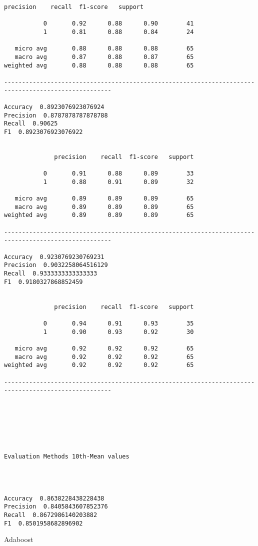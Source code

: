 \documentclass[11pt]{article}
\begin{document}
\begin{Verbatim}[commandchars=\\\{\}]
              precision    recall  f1-score   support

           0       0.92      0.88      0.90        41
           1       0.81      0.88      0.84        24

   micro avg       0.88      0.88      0.88        65
   macro avg       0.87      0.88      0.87        65
weighted avg       0.88      0.88      0.88        65

---------------------------------------------------------------------------------------------------- 

Accuracy  0.8923076923076924
Precision  0.8787878787878788
Recall  0.90625
F1  0.8923076923076922


              precision    recall  f1-score   support

           0       0.91      0.88      0.89        33
           1       0.88      0.91      0.89        32

   micro avg       0.89      0.89      0.89        65
   macro avg       0.89      0.89      0.89        65
weighted avg       0.89      0.89      0.89        65

---------------------------------------------------------------------------------------------------- 

Accuracy  0.9230769230769231
Precision  0.9032258064516129
Recall  0.9333333333333333
F1  0.9180327868852459


              precision    recall  f1-score   support

           0       0.94      0.91      0.93        35
           1       0.90      0.93      0.92        30

   micro avg       0.92      0.92      0.92        65
   macro avg       0.92      0.92      0.92        65
weighted avg       0.92      0.92      0.92        65

---------------------------------------------------------------------------------------------------- 







Evaluation Methods 10th-Mean values




Accuracy  0.8638228438228438
Precision  0.8405843607852376
Recall  0.8672986140203882
F1  0.8501958682896902

    \end{Verbatim}

    Adaboost
\end{document}
